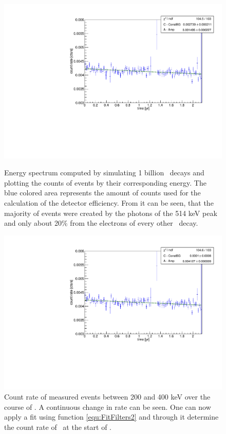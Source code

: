 \begin{figure}[t!]
	\centering
	\begin{minipage}[t]{.475\textwidth}
		\centering
		\includegraphics[width=\textwidth]{./Bilder/eventRateFit.pdf}
		\caption{
			Energy spectrum computed by simulating 1 billion \Kr\ decays and plotting the counts of events by their corresponding energy.
			The blue colored area represents the amount of counts used for the calculation of the detector efficiency.
			From it can be seen, that the majority of events were created by the photons of the 514 keV peak and only about 20$\%$ from the electrons of every other \Kr\ decay.
		}
		\label{fig:eventRateFit}
	\end{minipage}\hfill%
	\begin{minipage}[t]{.475\textwidth}
		\centering
		\includegraphics[width=\textwidth]{./Bilder/Argon.pdf}
		\caption{
			Count rate of measured events between 200 and 400 keV over the course of \PII.
			A continuous change in rate can be seen. 
			One can now apply a fit using function \ref{equ:FitFilters2} and through it determine the count rate of \Kr\ at the start of \PII.
		}
		\label{fig:Argon}
	\end{minipage}
\end{figure}
